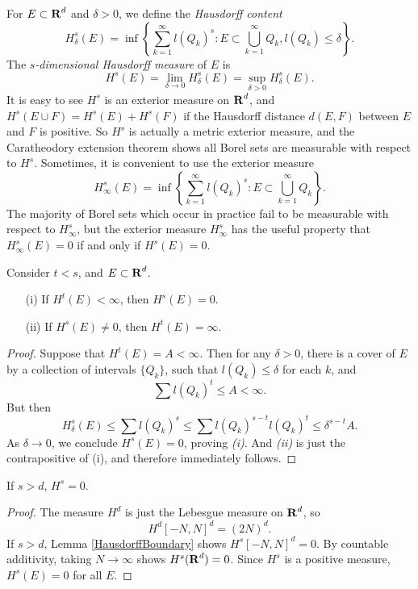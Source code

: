 For $E \subset \operatorname{\mathbf{R}}^d$ and $\delta > 0$, we define the \emph{Hausdorff content}
%
\[ H_\delta^s(E) = \inf \left\{ \sum_{k = 1}^\infty l(Q_k)^s : E \subset \bigcup_{k = 1}^\infty Q_k, l(Q_k) \leq \delta \right\}. \]
%
The \emph{$s$-dimensional Hausdorff measure} of $E$ is
%
\[ H^s(E) = \lim_{\delta \to 0} H_\delta^s(E) = \sup_{\delta > 0} H^s_\delta(E). \]
%
It is easy to see $H^s$ is an exterior measure on $\operatorname{\mathbf{R}}^d$, and $H^s(E \cup F) = H^s(E) + H^s(F)$ if the Hausdorff distance $d(E,F)$ between $E$ and $F$ is positive. So $H^s$ is actually a metric exterior measure, and the Caratheodory extension theorem shows all Borel sets are measurable with respect to $H^s$. Sometimes, it is convenient to use the exterior measure
%
\[ H^s_\infty(E) = \inf \left\{ \sum_{k = 1}^\infty l(Q_k)^s : E \subset \bigcup_{k = 1}^\infty Q_k \right\}. \]
%
The majority of Borel sets which occur in practice fail to be measurable with respect to $H^s_\infty$, but the exterior measure $H^s_\infty$ has the useful property that $H^s_\infty(E) = 0$ if and only if $H^s(E) = 0$.

\begin{lemma} \label{HausdorffBoundary}
	Consider $t < s$, and $E \subset \operatorname{\mathbf{R}}^d$.
	\begin{enumerate}
		\item[(i)] If $H^t(E) < \infty$, then $H^s(E) = 0$.
		\item[(ii)] If $H^s(E) \neq 0$, then $H^t(E) = \infty$.
	\end{enumerate}
\end{lemma}
\begin{proof}
	Suppose that $H^t(E) = A < \infty$. Then for any $\delta > 0$, there is a cover of $E$ by a collection of intervals $\{ Q_k \}$, such that $l(Q_k) \leq \delta$ for each $k$, and
	\[ \sum l(Q_k)^t \leq A < \infty. \]
	But then
	\[ H^s_\delta(E) \leq \sum l(Q_k)^s \leq \sum l(Q_k)^{s-t} l(Q_k)^t \leq \delta^{s-t} A. \]
	As $\delta \to 0$, we conclude $H^s(E) = 0$, proving \emph{(i)}. And \emph{(ii)} is just the contrapositive of (i), and therefore immediately follows.
\end{proof}

\begin{corollary} \label{corollaryhausdorffzero}
	If $s > d$, $H^s = 0$.
\end{corollary}
\begin{proof}
	The measure $H^d$ is just the Lebesgue measure on $\operatorname{\mathbf{R}}^d$, so
	\[ H^d[-N,N]^d = (2N)^d. \]
	If $s > d$, Lemma \ref{HausdorffBoundary} shows $H^s[-N,N]^d = 0$. By countable additivity, taking $N \to \infty$ shows $H^s(\operatorname{\mathbf{R}}^d) = 0$. Since $H^s$ is a positive measure, $H^s(E) = 0$ for all $E$.
\end{proof}

